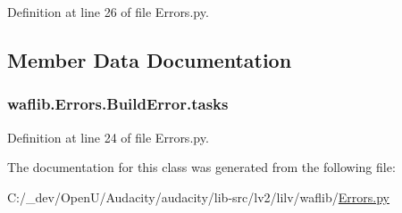 Definition at line 26 of file Errors.\+py.



\subsection{Member Data Documentation}
\subsubsection[{\texorpdfstring{tasks}{tasks}}]{\setlength{\rightskip}{0pt plus 5cm}waflib.\+Errors.\+Build\+Error.\+tasks}\hypertarget{classwaflib_1_1_errors_1_1_build_error_aa1bd7604d6ce50108307cdbd0d228211}{}\label{classwaflib_1_1_errors_1_1_build_error_aa1bd7604d6ce50108307cdbd0d228211}


Definition at line 24 of file Errors.\+py.



The documentation for this class was generated from the following file\+:\begin{DoxyCompactItemize}
\item 
C\+:/\+\_\+dev/\+Open\+U/\+Audacity/audacity/lib-\/src/lv2/lilv/waflib/\hyperlink{lilv_2waflib_2_errors_8py}{Errors.\+py}\end{DoxyCompactItemize}
